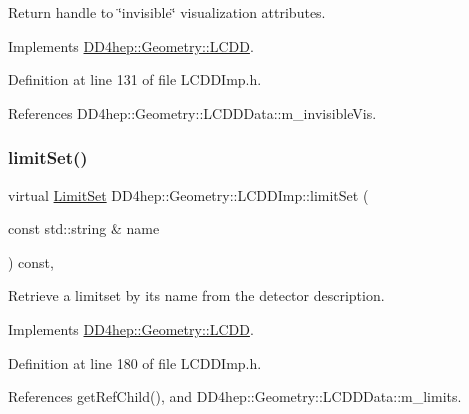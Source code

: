 Return handle to \char`\"{}invisible\char`\"{} visualization attributes. 



Implements \hyperlink{class_d_d4hep_1_1_geometry_1_1_l_c_d_d_acafee280cadae2b44117eb751e0790aa}{D\+D4hep\+::\+Geometry\+::\+L\+C\+DD}.



Definition at line 131 of file L\+C\+D\+D\+Imp.\+h.



References D\+D4hep\+::\+Geometry\+::\+L\+C\+D\+D\+Data\+::m\+\_\+invisible\+Vis.

\hypertarget{class_d_d4hep_1_1_geometry_1_1_l_c_d_d_imp_a3736cb6b91d8cbc0f72f6fca88cfa8dd}{}\label{class_d_d4hep_1_1_geometry_1_1_l_c_d_d_imp_a3736cb6b91d8cbc0f72f6fca88cfa8dd} 
\subsubsection{\texorpdfstring{limit\+Set()}{limitSet()}}
{\footnotesize\ttfamily virtual \hyperlink{class_d_d4hep_1_1_geometry_1_1_limit_set}{Limit\+Set} D\+D4hep\+::\+Geometry\+::\+L\+C\+D\+D\+Imp\+::limit\+Set (\begin{DoxyParamCaption}\item[{const std\+::string \&}]{name }\end{DoxyParamCaption}) const\hspace{0.3cm}{\ttfamily [inline]}, {\ttfamily [virtual]}}



Retrieve a limitset by it\textquotesingle{}s name from the detector description. 



Implements \hyperlink{class_d_d4hep_1_1_geometry_1_1_l_c_d_d_a7e98996675e9c00d6b64010415511813}{D\+D4hep\+::\+Geometry\+::\+L\+C\+DD}.



Definition at line 180 of file L\+C\+D\+D\+Imp.\+h.



References get\+Ref\+Child(), and D\+D4hep\+::\+Geometry\+::\+L\+C\+D\+D\+Data\+::m\+\_\+limits.

\hypertarget{class_d_d4hep_1_1_geometry_1_1_l_c_d_d_imp_a008349bcbcd8e079b14dfde20b88ebad}{}\label{class_d_d4hep_1_1_geometry_1_1_l_c_d_d_imp_a008349bcbcd8e079b14dfde20b88ebad} 
